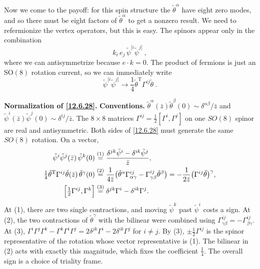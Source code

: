 Now we come to the payoff: for this spin structure the $\tilde{\theta}^\alpha$ have eight zero modes, and so there must be eight factors of $\tilde{\theta}^\alpha$ to get a nonzero result. We need to refermionize the vertex operators, but this is easy. The spinors appear only in the combination
\begin{equation}
	k_i\,e_j\,\tilde{\psi}^{[i}\tilde{\psi}^{j]} \:, \label{12.6.27}
\end{equation}
where we can antisymmetrize because $e\cdot k = 0$. The product of fermions is just an $\mathrm{SO}(8)$ rotation current, so we can immediately write
\begin{equation}
	\tilde{\psi}^{[i}\tilde{\psi}^{j]} \longrightarrow \frac{1}{4}\tilde{\theta}^{\mathrm{T}}\Gamma^{ij}\tilde{\theta} \:. \label{12.6.28}
\end{equation}
\begin{tcolorbox}[breakable]
	\begin{remark}
		\textbf{Normalization of \eqref{12.6.28}.} \textbf{Conventions.} $\tilde\theta^{\alpha}(\bar z)\tilde\theta^{\beta}(0)\sim\delta^{\alpha\beta}/\bar z$ and $\tilde\psi^{i}(\bar z)\tilde\psi^{j}(0)\sim\delta^{ij}/\bar z$. The $8\times8$ matrices $\Gamma^{ij}=\frac12[\Gamma^{i},\Gamma^{j}]$ on one $SO(8)$ spinor are real and antisymmetric. Both sides of \eqref{12.6.28} must generate the same $SO(8)$ rotation. On a vector,
		\begin{align*}
			\tilde\psi^{i}\tilde\psi^{j}(\bar z)\,\tilde\psi^{k}(0)&\overset{(1)}{=} \frac{\delta^{jk}\tilde\psi^{i}-\delta^{ik}\tilde\psi^{j}}{\bar z} ,\\
			\tfrac14\tilde\theta^{\mathrm T}\Gamma^{ij}\tilde\theta(\bar z)\,\tilde\theta^{\gamma}(0)&\overset{(2)}{=} \frac{1}{4\bar z}\bigl(\tilde\theta^{\alpha}\Gamma^{ij}_{\alpha\gamma}-\Gamma^{ij}_{\gamma\beta}\tilde\theta^{\beta}\bigr)=-\frac{1}{2\bar z}\bigl(\Gamma^{ij}\tilde\theta\bigr)^{\gamma} ,\\
			\Bigl[\tfrac12\Gamma^{ij},\Gamma^{k}\Bigr]&\overset{(3)}{=} \delta^{jk}\Gamma^{i}-\delta^{ik}\Gamma^{j} .
		\end{align*}
		At (1), there are two single contractions, and moving $\tilde\psi^{k}$ past $\tilde\psi^{i}$ costs a sign. At (2), the two contractions of $\tilde\theta^{\gamma}$ with the bilinear were combined using $\Gamma^{ij}_{\gamma\beta}=-\Gamma^{ij}_{\beta\gamma}$. At (3), $\Gamma^{i}\Gamma^{j}\Gamma^{k}-\Gamma^{k}\Gamma^{i}\Gamma^{j}=2\delta^{jk}\Gamma^{i}-2\delta^{ik}\Gamma^{j}$ for $i\neq j$. By (3), $\pm\frac12\Gamma^{ij}$ is the spinor representative of the rotation whose vector representative is (1). The bilinear in (2) acts with exactly this magnitude, which fixes the coefficient $\frac14$. The overall sign is a choice of triality frame.
	\end{remark}
\end{tcolorbox}
